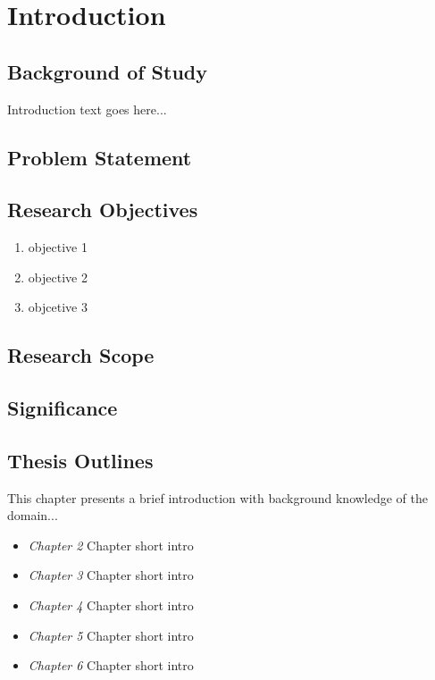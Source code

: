 \chapter{ Introduction}\label{chapter1}%

\section{Background of Study}

Introduction text goes here... 

\section{Problem Statement} \label{problems}






\section{Research Objectives}\label{objectives}


\begin{enumerate}[itemindent=-0.2cm,labelsep=0.4cm]%
	\item objective 1
	\item objective 2
	\item objcetive 3
	
\end{enumerate}

\section{Research Scope} \label{scope}

\section{Significance}

\section{Thesis Outlines}

This chapter presents a brief introduction with background knowledge of the domain...

\begin{itemize}
\item \textit{Chapter 2} Chapter short intro

\item \textit{Chapter 3} Chapter short intro

\item \textit{Chapter 4} Chapter short intro

\item \textit{Chapter 5} Chapter short intro

\item \textit{Chapter 6} Chapter short intro
\end{itemize}